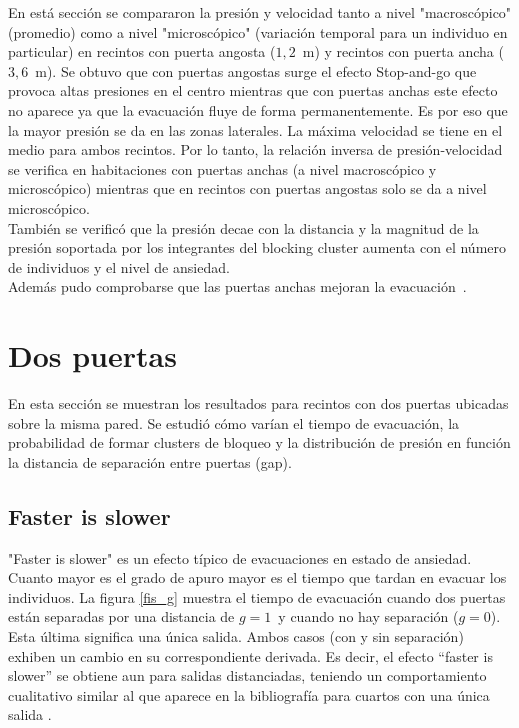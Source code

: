 En está sección se compararon la presión y velocidad tanto a nivel "macroscópico" (promedio) como a nivel "microscópico" (variación temporal para un individuo en particular) en recintos con puerta angosta ($1,2$~m) y recintos con puerta ancha ($3,6$~m). Se obtuvo que con puertas angostas surge el efecto Stop-and-go que provoca altas presiones en el centro mientras que con puertas anchas este efecto no aparece ya que la evacuación fluye de forma permanentemente. Es por eso que la mayor presión se da en las zonas laterales. La máxima velocidad se tiene en el medio para ambos recintos. Por lo tanto, la relación inversa de presión-velocidad se verifica en habitaciones con puertas anchas (a nivel macroscópico y microscópico) mientras que en recintos con puertas angostas solo se da a nivel microscópico.\\

También se verificó que la presión decae con la distancia y la magnitud de la presión soportada por los integrantes del blocking cluster aumenta con el número de individuos y el nivel de ansiedad.\\
Además pudo comprobarse que las puertas anchas mejoran la evacuación~\cite{huanhuan1}.  

\newpage

\section{Dos puertas}

En esta sección se muestran los resultados para recintos con dos puertas ubicadas sobre la misma pared. Se estudió cómo varían el tiempo de evacuación, la probabilidad de formar clusters de bloqueo y la distribución de presión en función la distancia de separación entre puertas (gap).  

\subsection{Faster is slower}

"Faster is slower" es un efecto típico de evacuaciones en estado de ansiedad. Cuanto mayor es el grado de apuro mayor es el tiempo que tardan en evacuar los individuos. 
La figura \ref{fis_g} muestra el tiempo de evacuación cuando dos puertas están separadas por una distancia de $g=1\,$ 
y cuando no hay separación ($g=0$). Esta última significa una única salida. Ambos casos (con y sin separación) exhiben un cambio en su correspondiente derivada. Es decir, el efecto ``faster is slower'' se obtiene aun para salidas distanciadas, teniendo un comportamiento cualitativo similar al que aparece en la bibliografía para cuartos con una única salida \cite{Helbing1,Dorso1}.\\ 

